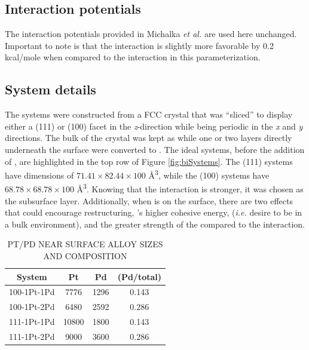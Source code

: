 \subsection{Interaction potentials}
The interaction potentials provided in Michalka {\em et
al.}\citep{Michalka:2015aa} are used here unchanged. Important to note is that
the  interaction is slightly more favorable by 0.2 kcal/mole
when compared to the  interaction in this parameterization.

\subsection{System details}
The systems were constructed from a FCC  crystal that was ``sliced'' to
display either a (111) or (100) facet in the {\em z}-direction while being
periodic in the {\em x} and {\em y} directions. The bulk of the crystal was
kept as  while one or two layers directly underneath the surface were
converted to . The ideal systems, before the addition of , are
highlighted in the top row of Figure \ref{fig:biSystems}. The (111) systems
have dimensions of $71.41\times82.44\times100$ \AA\textsuperscript{3}, while
the (100) systems have $68.78\times68.78\times100$ \AA\textsuperscript{3}.
Knowing that the  interaction is stronger, it was chosen as
the subsurface layer. Additionally, when  is on the surface, there are
two effects that could encourage restructuring, 's higher cohesive
energy, ({\em i.e.} desire to be in a bulk environment), and the greater
strength of the  compared to the 
interaction.

\begin{table}
  \caption{PT/PD NEAR SURFACE ALLOY SIZES AND COMPOSITION}
  \centering
  \begin{threeparttable}
  \begin{tabular}{ c ccc }
  \hline
  \hline
  \textbf{System} & \textbf{Pt} & \textbf{Pd} &  \textbf{(Pd/total)} \\
  \hline
  100-1Pt-1Pd & 7776 & 1296  & 0.143 \\
  100-1Pt-2Pd & 6480  & 2592  & 0.286 \\
  111-1Pt-1Pd & 10800  & 1800  & 0.143 \\
  111-1Pt-2Pd & 9000 & 3600  & 0.286 \\
  \hline
  \hline
  \end{tabular}
  \end{threeparttable}
\label{tab:systems1}
\end{table}


